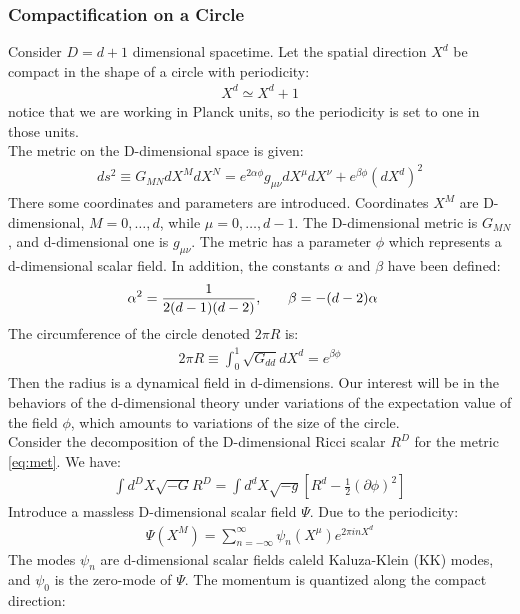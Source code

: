 \subsubsection{Compactification on a Circle}
Consider $D=d+1$ dimensional spacetime. Let the spatial direction $X^{d}$ be compact in the shape of a circle with periodicity:
\begin{align}
    X^{d} \simeq X^{d} +1
\end{align}
notice that we are working in Planck units, so the periodicity is set to one in those units. \\
\indent The metric on the D-dimensional space is given:
\begin{align}
    \label{eq:met}
    ds^{2} \equiv G_{MN} dX^{M}dX^{N} = e^{2\alpha\phi}g_{\mu\nu} dX^{\mu}dX^{\nu} + e^{\beta\phi}(dX^{d})^{2}
\end{align}
There some coordinates and parameters are introduced. Coordinates $X^{M}$ are D-dimensional, $M=0, \dotso , d$, while $\mu = 0, \dotso ,d-1$. The D-dimensional metric is $G_{MN}$, and d-dimensional one is $g_{\mu\nu}$. The metric has a parameter $\phi$ which represents a d-dimensional scalar field. In addition, the constants $\alpha$ and $\beta$ have been defined:
\begin{align}
    \alpha^{2} = \frac{1}{2(d-1)(d-2)} , & \qq{} \beta = -(d-2) \alpha
\end{align}
The circumference of the circle denoted $2\pi R$ is:
\begin{align}
    \label{eq:circ}
    2\pi R \equiv \int _{0}^{1} \sqrt{G_{dd}}dX^{d} = e^{\beta\phi}
\end{align}
Then the radius is a dynamical field in d-dimensions. Our interest will be in the behaviors of the d-dimensional theory under variations of the expectation value of the field $\phi$, which amounts to variations of the size of the circle. \\
\indent Consider the decomposition of the D-dimensional Ricci scalar $R^{D}$ for the metric \ref{eq:met}. We have:
\begin{align}
    \label{eq:eff}
    \int d^{D}X \sqrt{-G} R^{D} = \int d^{d}X \sqrt{-g} \left[R^{d} -\frac{1}{2} (\partial \phi)^{2} \right]
\end{align}
Introduce a massless D-dimensional scalar field $\Psi$. Due to the periodicity:
\begin{align}
    \Psi (X^{M}) = \sum_{n=-\infty}^{\infty} \psi_{n} (X^{\mu}) e^{2\pi i n X^{d}}
\end{align}
The modes $\psi _n$ are d-dimensional scalar fields caleld Kaluza-Klein (KK) modes, and $\psi _{0}$ is the zero-mode of $\Psi$. The momentum is quantized along the compact direction:
